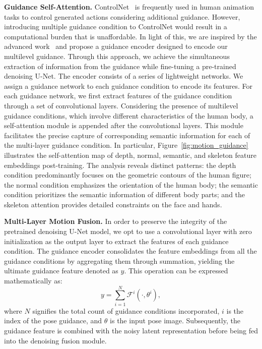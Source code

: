 \textbf{Guidance Self-Attention.}
ControlNet~\cite{zhang2023adding} is frequently used in human animation tasks to control generated actions considering additional guidance. 
However, introducing multiple guidance condition to ControlNet would result in a computational burden that is unaffordable.
In light of this, we are inspired by the advanced work~\cite{hu2023animate} and propose a guidance encoder designed to encode our multilevel guidance. 
Through this approach, we achieve the simultaneous extraction of information from the guidance while fine-tuning a pre-trained denoising U-Net.
The encoder consists of a series of lightweight networks. We assign a guidance network to each guidance condition to encode its features. 
For each guidance network, we first extract features of the guidance condition through a set of convolutional layers. 
Considering the presence of multilevel guidance conditions, which involve different characteristics of the human body, a self-attention module is appended after the convolutional layers.
This module facilitates the precise capture of corresponding semantic information for each of the multi-layer guidance condition. 
In particular, Figure~\ref{fig:motion_guidance} illustrates the self-attention map of depth, normal, semantic, and skeleton feature embeddings post-training.
The analysis reveals distinct patterns: the depth condition predominantly focuses on the geometric contours of the human figure; 
the normal condition emphasizes the orientation of the human body; 
the semantic condition prioritizes the semantic information of different body parts; 
and the skeleton attention provides detailed constraints on the face and hands.

\textbf{Multi-Layer Motion Fusion.}
In order to preserve the integrity of the pretrained denoising U-Net model, we opt to use a convolutional layer with zero initialization as the output layer to extract the features of each guidance condition.
The guidance encoder consolidates the feature embeddings from all the guidance conditions by aggregating them through summation, yielding the ultimate guidance feature denoted as $y$. 
This operation can be expressed mathematically as: 
\begin{equation}
    y = \sum_{i=1}^{N}{\mathcal{F}^i(\cdot, \theta^i)},
\end{equation}
where $N$ signifies the total count of guidance conditions incorporated, $i$ is the index of the pose guidance, and $\theta$ is the input pose image. 
Subsequently, the guidance feature is combined with the noisy latent representation before being fed into the denoising fusion module.

